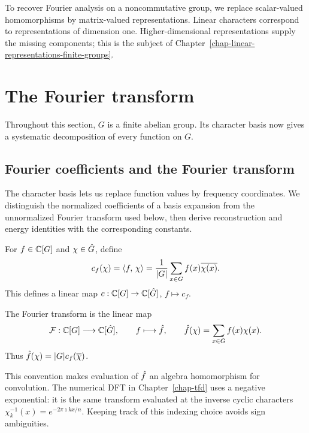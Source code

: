 
\begin{rem}
To recover Fourier analysis on a noncommutative group, we replace scalar-valued
homomorphisms by matrix-valued representations. Linear characters correspond
to representations of dimension one. Higher-dimensional representations
supply the missing components; this is the subject of
Chapter~\ref{chap-linear-representations-finite-groups}.
\end{rem}

\section{The Fourier transform}
\label{sect1-transforme-fourier}
Throughout this section, $G$ is a finite abelian group. Its character basis
now gives a systematic decomposition of every function on $G$.

\subsection{Fourier coefficients and the Fourier transform}
\label{sect2-coef-fourier-transforme-fourier}

The character basis lets us replace function values by frequency
coordinates. We distinguish the normalized coefficients of a basis expansion
from the unnormalized Fourier transform used below, then derive
reconstruction and energy identities with the corresponding constants.

\begin{defn}
\label{notation-21}
For $f\in\mathbb{C}[G]$ and $\chi\in\hat{G}$, define
\[
 c_f(\chi)=\langle f,\,\chi\rangle
 =\frac1{|G|}\sum_{x\in G}f(x)\overline{\chi(x)}.
\]
This defines a linear map $c:\mathbb{C}[G]\to\mathbb{C}[\hat{G}]$, $f\mapsto c_f$.
\end{defn}


\begin{defn}
\label{notation-22}
The Fourier transform is the linear map
\begin{equation}
\label{eq-transf-fourier-grpe-abelien}
 \mathcal{F}:\mathbb{C}[G]\longrightarrow\mathbb{C}[\hat{G}],\qquad f\longmapsto\hat{f},
 \qquad \hat{f}(\chi)=\sum_{x\in G}f(x)\chi(x).
\end{equation}
Thus $\hat{f}(\chi)=|G|c_f(\overline{\chi})$.
\end{defn}
This convention makes evaluation of $\hat{f}$ an algebra homomorphism for
convolution. The numerical DFT in Chapter~\ref{chap-tfd} uses a negative
exponential: it is the same transform evaluated at the inverse cyclic
characters $\chi_k^{-1}(x)=e^{-2\pi\imath kx/n}$. Keeping track of this
indexing choice avoids sign ambiguities.

